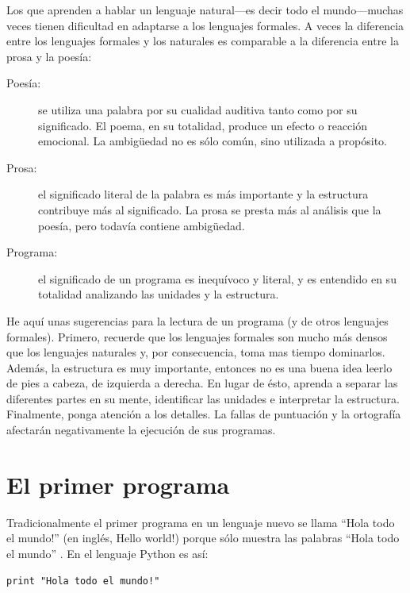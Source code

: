 Los que aprenden a hablar un lenguaje natural---es decir todo el 
mundo---muchas
veces tienen dificultad en adaptarse a los lenguajes formales. A veces
la diferencia entre los lenguajes formales y los naturales es 
comparable
a la diferencia entre la prosa y la poesía:


\begin{description}

\item[Poesía:] se utiliza una palabra por su cualidad auditiva
tanto como por su significado. El poema, en su totalidad, produce
un efecto o reacción emocional. La ambigüedad no es sólo común, sino
utilizada a propósito.

\item[Prosa:] el significado literal de la palabra es más importante
y la estructura contribuye más al significado. La prosa se presta
más al análisis que la poesía, pero todavía contiene ambigüedad.

\item[Programa:] el significado de un programa es inequívoco y
literal, y es entendido en su totalidad analizando las unidades y
la estructura.

\end{description}

He aquí unas sugerencias para la lectura de un programa (y de otros
lenguajes formales). Primero, recuerde que los lenguajes formales
son mucho más densos que los lenguajes naturales y, por consecuencia,
toma mas tiempo dominarlos. Además, la estructura es muy
importante, entonces no es una buena idea leerlo de pies a cabeza,
de izquierda a derecha. En lugar de ésto, aprenda a separar las diferentes
partes en su mente, identificar las unidades e interpretar la
estructura. Finalmente, ponga atención a los detalles. La fallas
de puntuación y la ortografía afectarán negativamente la ejecución de 
sus programas.

\section{El primer programa}
\label{hello}
\label{hello world}

Tradicionalmente el primer programa en un lenguaje nuevo se llama
``Hola todo el mundo!'' (en inglés, Hello world!) porque sólo muestra las
palabras ``Hola todo el mundo'' . En el lenguaje Python es así:

\beforeverb
\begin{verbatim}
print "Hola todo el mundo!"
\end{verbatim}
\afterverb
%

